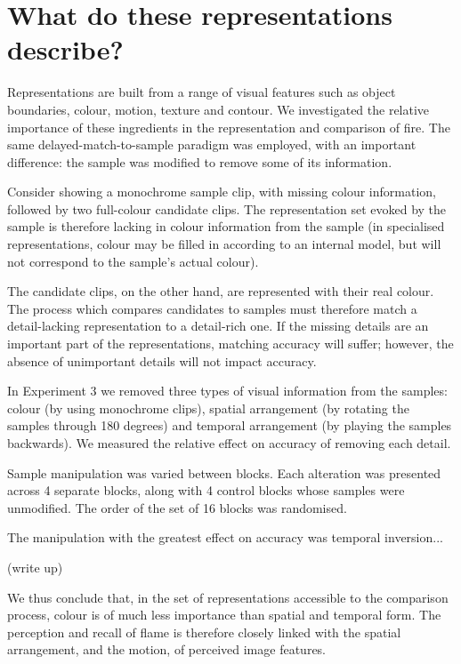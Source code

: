 \documentclass{jov}
\begin{document}
\section{What do these representations describe?}

Representations are built from a range of visual features such as object boundaries, colour, motion, texture and contour. We investigated the relative importance of these ingredients in the representation and comparison of fire. The same delayed-match-to-sample paradigm was employed, with an important difference: the sample was modified to remove some of its information. 

Consider showing a monochrome sample clip, with missing colour information, followed by two full-colour candidate clips. The representation set evoked by the sample is therefore lacking in colour information from the sample (in specialised representations, colour may be filled in according to an internal model, but will not correspond to the sample's actual colour).

The candidate clips, on the other hand, are represented with their real colour. The process which compares candidates to samples must therefore match a detail-lacking representation to a detail-rich one. If the missing details are an important part of the representations, matching accuracy will suffer; however, the absence of unimportant details will not impact accuracy.

In Experiment 3 we removed three types of visual information from the samples: colour (by using monochrome clips), spatial arrangement (by rotating the samples through 180 degrees) and temporal arrangement (by playing the samples backwards). We measured the relative effect on accuracy of removing each detail.

Sample manipulation was varied between blocks. Each alteration was presented across 4 separate blocks, along with 4 control blocks whose samples were unmodified. The order of the set of 16 blocks was randomised.

The manipulation with the greatest effect on accuracy was temporal inversion...

(write up)


We thus conclude that, in the set of representations accessible to the comparison process, colour is of much less importance than spatial and temporal form. The perception and recall of flame is therefore closely linked with the spatial arrangement, and the motion, of perceived image features.
\end{document}
